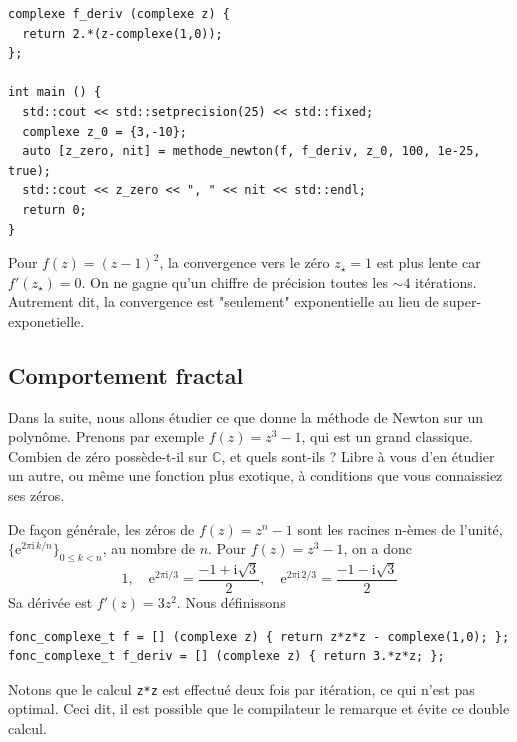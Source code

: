 \documentclass{book}
\newcommand{\inline}[1]{\texttt{#1}}
\begin{document}
\begin{correction}
\begin{verbatim}
complexe f_deriv (complexe z) {
  return 2.*(z-complexe(1,0));
};

int main () {
  std::cout << std::setprecision(25) << std::fixed;
  complexe z_0 = {3,-10};
  auto [z_zero, nit] = methode_newton(f, f_deriv, z_0, 100, 1e-25, true);
  std::cout << z_zero << ", " << nit << std::endl;
  return 0;
}
\end{verbatim}

Pour $f(z)=(z-1)^2$, la convergence vers le zéro $z_\star=1$ est plus lente car $f'(z_\star) = 0$. On ne gagne qu'un chiffre de précision toutes les $\sim 4$ itérations. Autrement dit, la convergence est "seulement" exponentielle au lieu de super-exponetielle.
\end{correction}


\subsection{Comportement fractal}

Dans la suite, nous allons étudier ce que donne la méthode de Newton sur un polynôme. Prenons par exemple $f(z)=z^3-1$, qui est un grand classique. Combien de zéro possède-t-il sur $\mathbb{C}$, et quels sont-ils ? Libre à vous d'en étudier un autre, ou même une fonction plus exotique, à conditions que vous connaissiez ses zéros.\\

\begin{correction}
De façon générale, les zéros de $f(z)=z^n-1$ sont les racines n-èmes de l'unité, $\{ \mathrm{e}^{2\pi \mathrm{i}\,k/n} \}_{0\leq k < n}$, au nombre de $n$. Pour $f(z)=z^3-1$, on a donc
  \begin{equation*}
  1,\quad \mathrm{e}^{2\pi \mathrm{i}/3}=\frac{-1+\mathrm{i}\sqrt{3}}{2},\quad \mathrm{e}^{2\pi \mathrm{i}\,2/3}=\frac{-1-\mathrm{i}\sqrt{3}}{2}
  \end{equation*}
Sa dérivée est $f'(z)=3 z^2$. Nous définissons
\begin{verbatim}
fonc_complexe_t f = [] (complexe z) { return z*z*z - complexe(1,0); };
fonc_complexe_t f_deriv = [] (complexe z) { return 3.*z*z; };
\end{verbatim}
Notons que le calcul \inline{z*z} est effectué deux fois par itération, ce qui n'est pas optimal. Ceci dit, il est possible que le compilateur le remarque et évite ce double calcul.
\end{correction}
\end{document}
